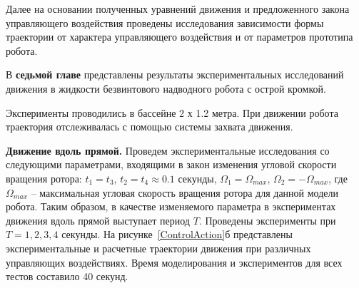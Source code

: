
Далее на основании полученных уравнений движения и предложенного закона управляющего воздействия проведены исследования зависимости формы траектории от характера управляющего воздействия и от параметров прототипа робота. 











В {\textbf{седьмой главе}} представлены результаты экспериментальных исследований движения в жидкости безвинтового надводного робота с острой кромкой.

Эксперименты проводились в бассейне 2 х 1.2 метра. При движении робота траектория отслеживалась с помощью системы захвата движения.%

\textbf{Движение вдоль прямой.} Проведем экспериментальные исследования со следующими параметрами, входящими в закон изменения угловой скорости вращения ротора: $t_1=t_3$, $ t_2 = t_4 \approx 0.1 $ секунды, $ \Omega_1 = \Omega_{max} $, $ \Omega_2 = -\Omega_{max} $, где $ \Omega_{max} $ -- максимальная угловая скорость вращения ротора для данной модели робота. Таким образом, в качестве изменяемого параметра в экспериментах движения вдоль прямой выступает период $T$. %
Проведены эксперименты при $ T = 1, 2, 3, 4 $ секунды. На рисунке~\ref{ControlAction}б представлены экспериментальные и расчетные траектории движения при различных управляющих воздействиях. 
Время моделирования и экспериментов для всех тестов составило 40 секунд. %

